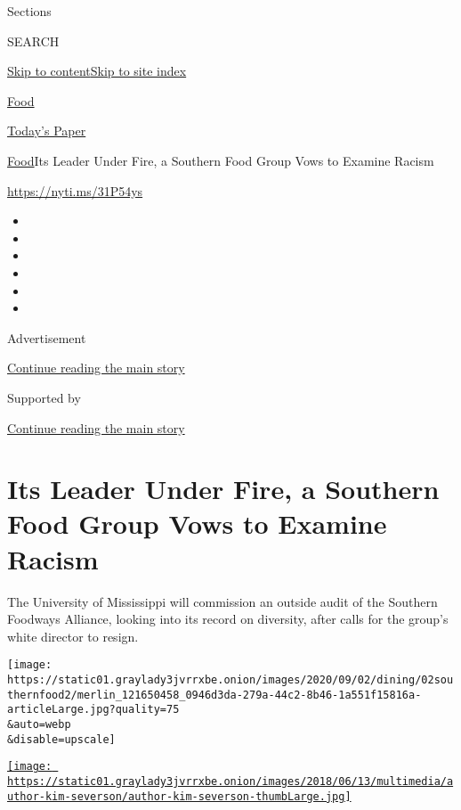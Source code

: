 Sections

SEARCH

\protect\hyperlink{site-content}{Skip to
content}\protect\hyperlink{site-index}{Skip to site index}

\href{https://www.nytimes3xbfgragh.onion/section/food}{Food}

\href{https://myaccount.nytimes3xbfgragh.onion/auth/login?response_type=cookie\&client_id=vi}{}

\href{https://www.nytimes3xbfgragh.onion/section/todayspaper}{Today's
Paper}

\href{/section/food}{Food}\textbar{}Its Leader Under Fire, a Southern
Food Group Vows to Examine Racism

\url{https://nyti.ms/31P54ys}

\begin{itemize}
\item
\item
\item
\item
\item
\item
\end{itemize}

Advertisement

\protect\hyperlink{after-top}{Continue reading the main story}

Supported by

\protect\hyperlink{after-sponsor}{Continue reading the main story}

\hypertarget{its-leader-under-fire-a-southern-food-group-vows-to-examine-racism}{%
\section{Its Leader Under Fire, a Southern Food Group Vows to Examine
Racism}\label{its-leader-under-fire-a-southern-food-group-vows-to-examine-racism}}

The University of Mississippi will commission an outside audit of the
Southern Foodways Alliance, looking into its record on diversity, after
calls for the group's white director to resign.

\texttt{[image: https://static01.graylady3jvrrxbe.onion/images/2020/09/02/dining/02southernfood2/merlin\_121650458\_0946d3da-279a-44c2-8b46-1a551f15816a-articleLarge.jpg?quality=75\\\&auto=webp\\\&disable=upscale]}

\href{https://www.nytimes3xbfgragh.onion/by/kim-severson}{\texttt{[image: https://static01.graylady3jvrrxbe.onion/images/2018/06/13/multimedia/author-kim-severson/author-kim-severson-thumbLarge.jpg]}}

